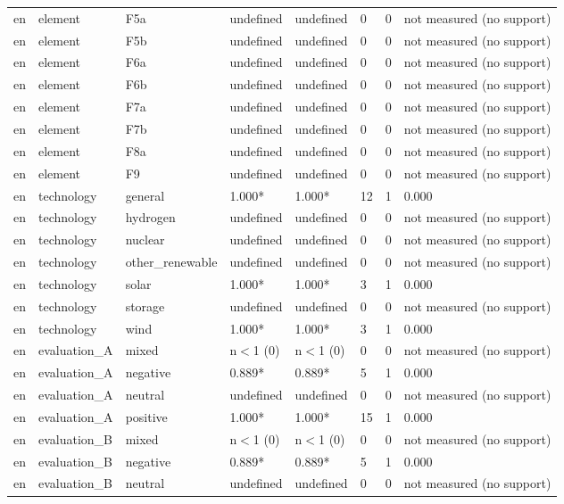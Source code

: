 \begin{table}[htbp]
\begin{tabular}{llllllll}
en & element & F5a & undefined & undefined & 0 & 0 & not measured (no support) \\
en & element & F5b & undefined & undefined & 0 & 0 & not measured (no support) \\
en & element & F6a & undefined & undefined & 0 & 0 & not measured (no support) \\
en & element & F6b & undefined & undefined & 0 & 0 & not measured (no support) \\
en & element & F7a & undefined & undefined & 0 & 0 & not measured (no support) \\
en & element & F7b & undefined & undefined & 0 & 0 & not measured (no support) \\
en & element & F8a & undefined & undefined & 0 & 0 & not measured (no support) \\
en & element & F9 & undefined & undefined & 0 & 0 & not measured (no support) \\
en & technology & general & 1.000* & 1.000* & 12 & 1 & 0.000 \\
en & technology & hydrogen & undefined & undefined & 0 & 0 & not measured (no support) \\
en & technology & nuclear & undefined & undefined & 0 & 0 & not measured (no support) \\
en & technology & other\_renewable & undefined & undefined & 0 & 0 & not measured (no support) \\
en & technology & solar & 1.000* & 1.000* & 3 & 1 & 0.000 \\
en & technology & storage & undefined & undefined & 0 & 0 & not measured (no support) \\
en & technology & wind & 1.000* & 1.000* & 3 & 1 & 0.000 \\
en & evaluation\_A & mixed & n$<$1 (0) & n$<$1 (0) & 0 & 0 & not measured (no support) \\
en & evaluation\_A & negative & 0.889* & 0.889* & 5 & 1 & 0.000 \\
en & evaluation\_A & neutral & undefined & undefined & 0 & 0 & not measured (no support) \\
en & evaluation\_A & positive & 1.000* & 1.000* & 15 & 1 & 0.000 \\
en & evaluation\_B & mixed & n$<$1 (0) & n$<$1 (0) & 0 & 0 & not measured (no support) \\
en & evaluation\_B & negative & 0.889* & 0.889* & 5 & 1 & 0.000 \\
en & evaluation\_B & neutral & undefined & undefined & 0 & 0 & not measured (no support) \\

\end{tabular}
\end{table}
